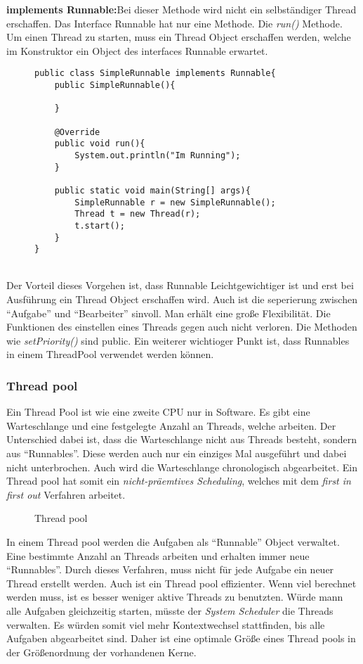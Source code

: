 \smallskip
\newline
\textbf{implements Runnable:}Bei dieser Methode wird nicht ein selbständiger Thread erschaffen. Das Interface Runnable hat nur eine Methode. Die \textit{run()} Methode.\cite{Java:Runnable} Um einen Thread zu starten, muss ein Thread Object erschaffen werden, welche im Konstruktor ein Object des interfaces Runnable erwartet.
\begin{figure}[h]
\begin{lstlisting}
public class SimpleRunnable implements Runnable{
    public SimpleRunnable(){

    }

    @Override
    public void run(){
        System.out.println("Im Running");
    }

    public static void main(String[] args){
        SimpleRunnable r = new SimpleRunnable();
        Thread t = new Thread(r);
        t.start();
    }
}
\end{lstlisting}
\end{figure}
\\Der Vorteil dieses Vorgehen ist, dass Runnable Leichtgewichtiger ist und erst bei Ausführung ein Thread Object erschaffen wird. Auch ist die seperierung zwischen ``Aufgabe'' und ``Bearbeiter'' sinvoll. Man erhält eine große Flexibilität. Die Funktionen des einstellen eines Threads gegen auch nicht verloren. Die Methoden wie \textit{setPriority()} sind public.\cite{Java:Thread} Ein weiterer wichtioger Punkt ist, dass Runnables in einem ThreadPool verwendet werden können.

\subsubsection{Thread pool}
Ein Thread Pool ist wie eine zweite CPU nur in Software. Es gibt eine Warteschlange und eine festgelegte Anzahl an Threads, welche arbeiten. Der Unterschied dabei ist, dass die Warteschlange nicht aus Threads besteht, sondern aus ``Runnables''. Diese werden auch nur ein einziges Mal ausgeführt und dabei nicht unterbrochen. Auch wird die Warteschlange chronologisch abgearbeitet. Ein Thread pool hat somit ein \textit{nicht-präemtives Scheduling}, welches mit dem \textit{first in first out} Verfahren arbeitet.\newpage
\begin{figure}[h]
    
    \caption{Thread pool}
\end{figure}
In einem Thread pool werden die Aufgaben als ``Runnable'' Object verwaltet. Eine bestimmte Anzahl an Threads arbeiten und erhalten immer neue ``Runnables''. Durch dieses Verfahren, muss nicht für jede Aufgabe ein neuer Thread erstellt werden. Auch ist ein Thread pool effizienter. Wenn viel berechnet werden muss, ist es besser weniger aktive Threads zu benutzten. Würde mann alle Aufgaben gleichzeitig starten, müsste der \textit{System Scheduler} die Threads verwalten. Es würden somit viel mehr Kontextwechsel stattfinden, bis alle Aufgaben abgearbeitet sind. Daher ist eine optimale Größe eines Thread pools in der Größenordnung der vorhandenen Kerne.

